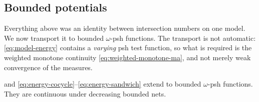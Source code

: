 \subsection{Bounded potentials}
\label{sec:ch26-bounded-energy}

Everything above was an identity between intersection numbers on one model.
We now transport it to bounded $\omega$-psh functions.  The transport is
not automatic: \eqref{eq:model-energy} contains a \emph{varying} psh test
function, so what is required is the weighted monotone continuity
\eqref{eq:weighted-monotone-ma}, and not merely weak convergence of the
measures.

\begin{proposition}\label{prop:bounded-energy-identities}
 and
\eqref{eq:energy-cocycle}--\eqref{eq:energy-sandwich} extend to bounded
$\omega$-psh functions. They are continuous under decreasing bounded nets.
\end{proposition}

